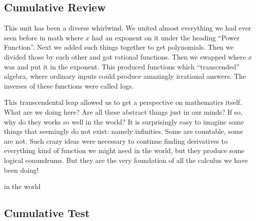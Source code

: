 \subsection{Cumulative Review}
This unit has been a diverse whirlwind.  We united almost everything we had ever seen
before in math where $x$ had an exponent on it under the heading ``Power Function''.
Next we added such things together to get polynomials.  Then we divided those by each
other and got rational functions.  Then we swapped where $x$ was and put it in the
exponent.  This produced functions which ``transcended'' algebra, where ordinary inputs
could produce amazingly irrational answers.  The inverses of these functions were called
logs.

This transcendental leap allowed us to get a perspective on mathematics itself.  What 
are we doing here?  Are all these abstract things just in our minds?  If so, why do they 
works so well in the world?  It is surprisingly easy to imagine some things that 
seemingly do not exist: namely infinities.  Some are countable, some are not.  Such
crazy ideas were necessary to continue finding derivatives to everything kind of function
we might need in the world, but they produce some logical conundrums.   But they
are the very foundation of all the calculus we have been doing!

in the world
\subsection{Cumulative Test}